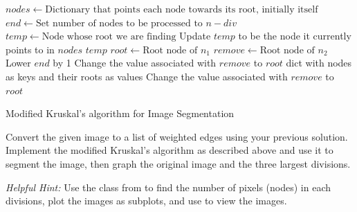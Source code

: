 \begin{algorithm}
\begin{algorithmic}[1]
	\State $nodes \gets \text{Dictionary that points each node towards its root, initially itself}$
	\State $end \gets \text{Set number of nodes to be processed to } n-div$
	 
		\State $temp \gets \text{Node whose root we are finding}$
			\State Update $temp$ to be the node it currently points to in $nodes$
			\State {} $temp$
		\EndWhile
	\EndFunction
		\State $root \gets \text{Root node of } n_1$
		\State $remove \gets \text{Root node of } n_2$
			\State Lower $end$ by 1
				\State Change the value associated with $remove$ to $root$
				\State {} dict with nodes as keys and their roots as values
			\EndIf
			\State Change the value associated with $remove$ to $root$
		\EndIf
	\EndFor	
\EndProcedure
\end{algorithmic}
\caption{Modified Kruskal's algorithm for Image Segmentation}
\label{alg:modifiedkruskal}
\end{algorithm}

\begin{problem}
Convert the given image to a list of weighted edges using your previous solution. Implement the modified Kruskal's algorithm as described above and use it to segment the image, then graph the original image and the three largest divisions. 

\emph{Helpful Hint:} Use the  class from  to find the number of pixels (nodes) in each divisions, plot the images as subplots, and use  to view the images.
\end{problem}

